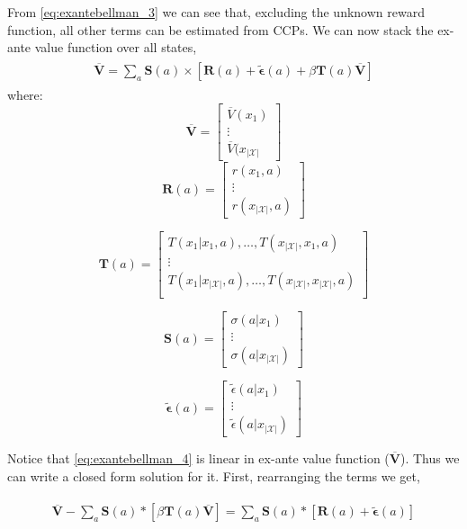 \documentclass{article}
\begin{document}
From \eqref{eq:exantebellman_3} we can see that, excluding the unknown reward function, all other terms can be estimated from CCPs. We can now stack the ex-ante value function over all states,
\begin{align} \label{eq:exantebellman_4}
    \begin{split}
    \overline{\mathbf{V}}=\sum_{a}\mathbf{S}(a) \times \left[\mathbf{R}(a)+\tilde{\bm{\epsilon}}(a)+\beta \mathbf{T}(a) \overline{\mathbf{V}}\right]
    \end{split}
\end{align}
where:
\[
\overline{\mathbf{V}}=\left[\begin{array}{c}\overline{V}(x_1)\\\vdots\\\overline{V}(x_{|\mathcal{X}|}\end{array}\right]
\]
\[
\mathbf{R}(a)=\left[\begin{array}{c}r(x_1,a)\\\vdots\\ r(x_{|\mathcal{X}|},a)\end{array}\right]
\]

\[
\mathbf{T}(a)=\left[\begin{array}{ccc}
T(x_1|x_1,a),\dots,T(x_{|\mathcal{X}|},x_1,a)\\
\vdots\\
T(x_1|x_{|\mathcal{X}|},a),\dots,T(x_{|\mathcal{X}|},x_{|\mathcal{X}|},a)\\
\end{array}\right]
\]

\[
\mathbf{S}(a)=\left[\begin{array}{c}\sigma(a|x_1)\\ \vdots\\ \sigma(a|x_{|\mathcal{X}|})\end{array} \right]
\]

\[
\tilde{\bm{\epsilon}}(a)=\left[\begin{array}{c}\tilde{\epsilon}(a|x_1)\\ \vdots \\ \tilde{\epsilon}(a|x_{|\mathcal{X}|})\end{array}\right]
\]



Notice that \eqref{eq:exantebellman_4} is linear in ex-ante value function ($\overline{\mathbf{V}}$). Thus we can write a closed form solution for it.
First, rearranging the terms we get,

\begin{align}
    \begin{split}
    \overline{\mathbf{V}}-\sum_{a}\mathbf{S}(a) *\left[ \beta \mathbf{T}(a) \overline{\mathbf{V}}\right]=\sum_{a}\mathbf{S}(a) *\left[ \mathbf{R}(a)+\tilde{\bm{\epsilon}}(a)\right]
    \end{split}
\end{align}
\end{document}
